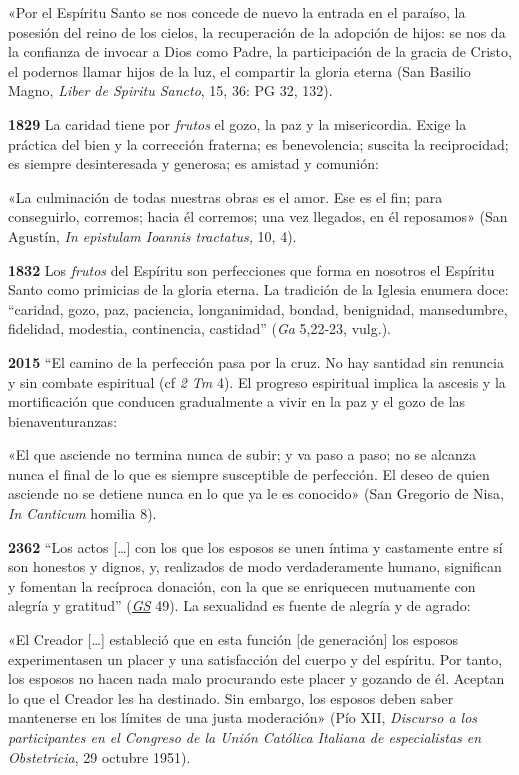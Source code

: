 \documentclass[]{article}
\begin{document}
«Por el Espíritu Santo se nos concede de nuevo la entrada en el paraíso,
la posesión del reino de los cielos, la recuperación de la adopción de
hijos: se nos da la confianza de invocar a Dios como Padre, la
participación de la gracia de Cristo, el podernos llamar hijos de la
luz, el compartir la gloria eterna (San Basilio Magno, \emph{Liber de
Spiritu Sancto}, 15, 36: PG 32, 132).

\textbf{1829} La caridad tiene por \emph{frutos} el gozo, la paz y la
misericordia. Exige la práctica del bien y la corrección fraterna; es
benevolencia; suscita la reciprocidad; es siempre desinteresada y
generosa; es amistad y comunión:

«La culminación de todas nuestras obras es el amor. Ese es el fin; para
conseguirlo, corremos; hacia él corremos; una vez llegados, en él
reposamos» (San Agustín, \emph{In epistulam Ioannis tractatus,} 10, 4).

\textbf{1832} Los \emph{frutos} del Espíritu son perfecciones que forma
en nosotros el Espíritu Santo como primicias de la gloria eterna. La
tradición de la Iglesia enumera doce: ``caridad, gozo, paz, paciencia,
longanimidad, bondad, benignidad, mansedumbre, fidelidad, modestia,
continencia, castidad'' (\emph{Ga} 5,22-23, vulg.).

\textbf{2015} ``El camino de la perfección pasa por la cruz. No hay
santidad sin renuncia y sin combate espiritual (cf \emph{2 Tm} 4). El
progreso espiritual implica la ascesis y la mortificación que conducen
gradualmente a vivir en la paz y el gozo de las bienaventuranzas:

«El que asciende no termina nunca de subir; y va paso a paso; no se
alcanza nunca el final de lo que es siempre susceptible de perfección.
El deseo de quien asciende no se detiene nunca en lo que ya le es
conocido» (San Gregorio de Nisa, \emph{In Canticum} homilia 8).

\textbf{2362} ``Los actos [\ldots{}] con los que los esposos se unen
íntima y castamente entre sí son honestos y dignos, y, realizados de
modo verdaderamente humano, significan y fomentan la recíproca donación,
con la que se enriquecen mutuamente con alegría y gratitud''
(\href{http://www.vatican.va/archive/hist_councils/ii_vatican_council/documents/vat-ii_const_19651207_gaudium-et-spes_sp.html}{\emph{GS}}
49). La sexualidad es fuente de alegría y de agrado:

«El Creador [\ldots{}] estableció que en esta función {[}de generación{]}
los esposos experimentasen un placer y una satisfacción del cuerpo y del
espíritu. Por tanto, los esposos no hacen nada malo procurando este
placer y gozando de él. Aceptan lo que el Creador les ha destinado. Sin
embargo, los esposos deben saber mantenerse en los límites de una justa
moderación» (Pío XII, \emph{Discurso a los participantes en el Congreso
de la Unión Católica Italiana de especialistas en Obstetricia}, 29
octubre 1951).
\end{document}
